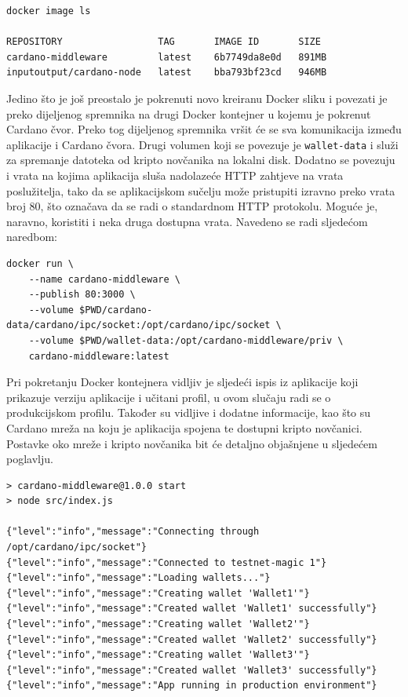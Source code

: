 \documentclass[times, utf8, diplomski]{fer}
\begin{document}
\begin{lstlisting}
docker image ls

REPOSITORY                 TAG       IMAGE ID       SIZE
cardano-middleware         latest    6b7749da8e0d   891MB
inputoutput/cardano-node   latest    bba793bf23cd   946MB
\end{lstlisting}

Jedino što je još preostalo je pokrenuti novo kreiranu Docker sliku i povezati je preko dijeljenog spremnika na drugi Docker kontejner u kojemu je pokrenut Cardano čvor. Preko tog dijeljenog spremnika vršit će se sva komunikacija između aplikacije i Cardano čvora. Drugi volumen koji se povezuje je \texttt{wallet-data} i služi za spremanje datoteka od kripto novčanika na lokalni disk. Dodatno se povezuju i vrata na kojima aplikacija sluša nadolazeće HTTP zahtjeve na vrata poslužitelja, tako da se aplikacijskom sučelju može pristupiti izravno preko vrata broj 80, što označava da se radi o standardnom HTTP protokolu. Moguće je, naravno, koristiti i neka druga dostupna vrata. Navedeno se radi sljedećom naredbom:

\begin{lstlisting}
docker run \
    --name cardano-middleware \
    --publish 80:3000 \
    --volume $PWD/cardano-data/cardano/ipc/socket:/opt/cardano/ipc/socket \
    --volume $PWD/wallet-data:/opt/cardano-middleware/priv \
    cardano-middleware:latest
\end{lstlisting}

Pri pokretanju Docker kontejnera vidljiv je sljedeći ispis iz aplikacije koji prikazuje verziju aplikacije i učitani profil, u ovom slučaju radi se o produkcijskom profilu. Također su vidljive i dodatne informacije, kao što su Cardano mreža na koju je aplikacija spojena te dostupni kripto novčanici. Postavke oko mreže i kripto novčanika bit će detaljno objašnjene u sljedećem poglavlju.

\begin{lstlisting}
> cardano-middleware@1.0.0 start
> node src/index.js

{"level":"info","message":"Connecting through /opt/cardano/ipc/socket"}
{"level":"info","message":"Connected to testnet-magic 1"}
{"level":"info","message":"Loading wallets..."}
{"level":"info","message":"Creating wallet 'Wallet1'"}
{"level":"info","message":"Created wallet 'Wallet1' successfully"}
{"level":"info","message":"Creating wallet 'Wallet2'"}
{"level":"info","message":"Created wallet 'Wallet2' successfully"}
{"level":"info","message":"Creating wallet 'Wallet3'"}
{"level":"info","message":"Created wallet 'Wallet3' successfully"}
{"level":"info","message":"App running in production environment"}
\end{lstlisting}
\end{document}
